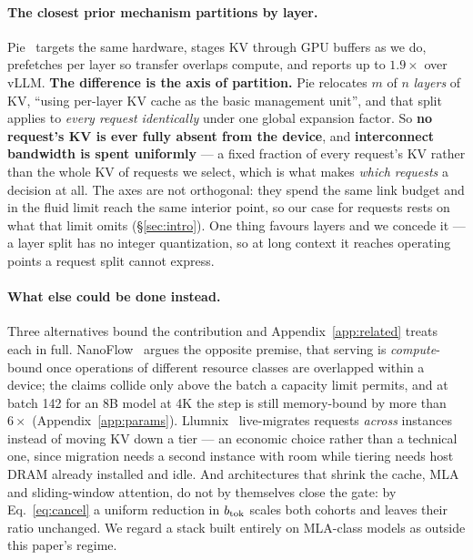 \paragraph{The closest prior mechanism partitions by layer.} Pie~\cite{pie}
targets the same hardware, stages KV through GPU buffers as we do, prefetches per
layer so transfer overlaps compute, and reports up to $1.9\times$ over vLLM.
\textbf{The difference is the axis of partition.} Pie relocates $m$ of $n$
\emph{layers} of KV, ``using per-layer KV cache as the basic management unit'',
and that split applies to \emph{every request identically} under one global
expansion factor. So \textbf{no request's KV is ever fully absent from the
device}, and \textbf{interconnect bandwidth is spent uniformly} --- a fixed
fraction of every request's KV rather than the whole KV of requests we select,
which is what makes \emph{which requests} a decision at all. The axes are not
orthogonal: they spend the same link budget and in the fluid limit reach the same
interior point, so our case for requests rests on what that limit omits
(\S\ref{sec:intro}). One thing favours layers and we concede it --- a layer split
has no integer quantization, so at long context it reaches operating points a
request split cannot express.

\paragraph{What else could be done instead.} Three alternatives bound the
contribution and Appendix~\ref{app:related} treats each in full.
NanoFlow~\cite{nanoflow} argues the opposite premise, that serving is
\emph{compute}-bound once operations of different resource classes are overlapped
within a device; the claims collide only above the batch a capacity limit permits,
and at batch 142 for an 8B model at 4K the step is still memory-bound by more than
$6\times$ (Appendix~\ref{app:params}). Llumnix~\cite{llumnix} live-migrates requests
\emph{across} instances instead of moving KV down a tier --- an economic choice
rather than a technical one, since migration needs a second instance with room while
tiering needs host DRAM already installed and idle. And architectures that shrink
the cache, MLA~\cite{deepseekv2} and sliding-window attention, do not by themselves
close the gate: by Eq.~\ref{eq:cancel} a uniform reduction in $b_{\mathrm{tok}}$ scales both
cohorts and leaves their ratio unchanged. We regard a stack built entirely on
MLA-class models as outside this paper's regime.


